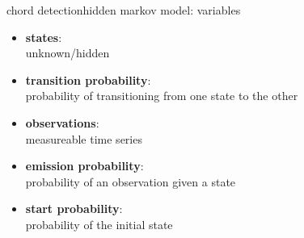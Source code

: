         \begin{frame}{chord detection}{hidden markov model: variables}
            \begin{itemize}
                \item	\textbf{states}:\\ unknown/hidden
                \smallskip
                \item	\textbf{transition probability}:\\ probability of transitioning from one state to the other
                \smallskip
                \item   \textbf{observations}:\\ measureable time series
                \smallskip
                \item	\textbf{emission probability}:\\ probability of an observation given a state
                \smallskip
                \item	\textbf{start probability}:\\ probability of the initial state
            \end{itemize}
        \end{frame}
